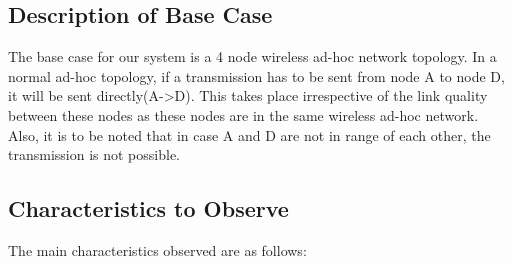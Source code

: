 \documentclass{article}
\begin{document}
\subsection{Description of Base Case}
The base case for our system is a 4 node wireless ad-hoc network topology. In a normal ad-hoc topology, if a
transmission has to be sent from node A to node D, it will be sent directly(A-\textgreater D). This takes place irrespective of the
link quality between these nodes as these nodes are in the same wireless ad-hoc network. Also, it is to be noted that in
case A and D are not in range of each other, the transmission is not possible.
\subsection{Characteristics to Observe}
The main characteristics observed are as follows:
\end{document}
